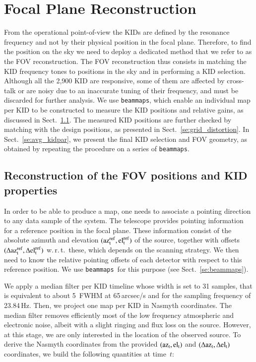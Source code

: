 \documentclass[traditionalabstract]{aa}
\newcommand{\elev}{\rm{el}}
\newcommand{\az}{\rm{az}}
\newcommand{\wrt}{w.\,r.\,t.}
\newcommand{\bms}{{\tt beammaps}}
\newcommand{\lp}[1]{#1}
\begin{document}
\section{Focal Plane Reconstruction}
\label{se:geometry}
%

{\lp From the operational point-of-view the KIDs are defined by the
resonance frequency and not by their physical position in the focal
plane. Therefore, to find the position on the sky we need to deploy
a dedicated method that we refer to as the FOV reconstruction.}
The FOV reconstruction thus consists in matching the KID frequency tones
to positions in the sky and in performing a KID selection.
Although all the 2,900 KID are responsive, some of them are affected by
cross-talk or are noisy due to an inaccurate tuning of their
frequency, and must be discarded for further analysis. We use \bms,
which enable an individual map per KID to be constructed %
to measure the KID positions and relative gains, as
discussed in Sect.~\ref{se:fov_geometry}. The measured KID positions
are further
checked by matching with the design positions, as presented in
Sect.~\ref{se:grid_distortion}. In Sect.~\ref{se:avg_kidpar}, we
present the final KID selection and FOV geometry, as obtained by
repeating the procedure on a series of \bms.  



\subsection{Reconstruction of the FOV positions and KID properties}
\label{se:fov_geometry}

In order to be able to produce a map, one needs to associate a pointing
direction to any data sample of the system. The telescope provides
pointing information for a reference position in the focal
plane. These information consist of the
absolute azimuth and elevation $(\az_t^{\rm{ref}},\elev_t^{\rm{ref}})$
of the source, together with offsets
$(\Delta\az_t^{\rm{ref}}, \Delta\elev_t^{\rm{ref}})$ \wrt~these{\lp, which 
depends on the scanning strategy.}
We then need to know the relative pointing offsets of each detector
with respect to this reference position. We use
\bms\ for this purpose (see Sect.~\ref{se:beammaps}).

We apply a median filter per KID timeline whose width is set to 31
samples, that is equivalent to about 5~FWHM at 65\,arcsec/s and for the
sampling frequency of
23.84\,Hz. Then, we project one map per KID in Nasmyth
coordinates. The median filter removes
efficiently most of the low frequency atmospheric and electronic
noise, albeit with a slight ringing and flux loss on the
source. However, at this stage, we are only interested in the location
of the observed source.
To derive the Nasmyth coordinates from the
provided $(\az_t,\elev_t)$ and $(\Delta\az_t,\Delta\elev_t)$
coordinates, we build the following quantities at time~$t$:
\end{document}

